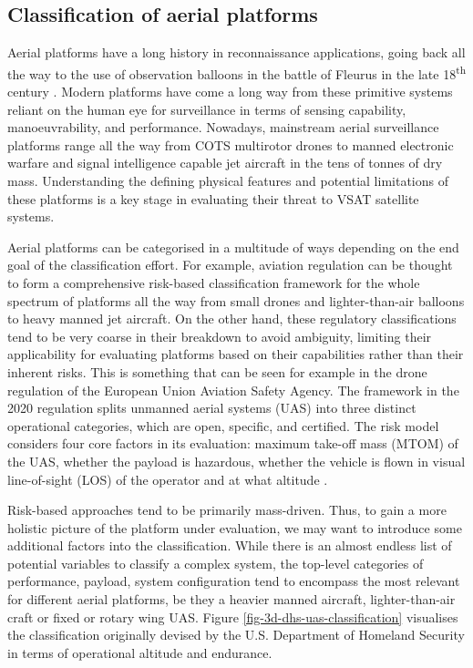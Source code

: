\documentclass[english, 12pt, a4paper, elec, utf8, a-1b, online]{aaltothesis}
\begin{document}
\subsection{Classification of aerial platforms} \label{ch-aerial-platforms}

Aerial platforms have a long history in reconnaissance applications, going back all the way to the use of observation balloons in the battle of Fleurus in the late 18\textsuperscript{th} century \cite{centennial-balloons-fleurus}.
Modern platforms have come a long way from these primitive systems reliant on the human eye for surveillance in terms of sensing capability, manoeuvrability, and performance.
Nowadays, mainstream aerial surveillance platforms range all the way from COTS multirotor drones to manned electronic warfare and signal intelligence capable jet aircraft in the tens of tonnes of dry mass.
Understanding the defining physical features and potential limitations of these platforms is a key stage in evaluating their threat to VSAT satellite systems.

Aerial platforms can be categorised in a multitude of ways depending on the end goal of the classification effort.
For example, aviation regulation can be thought to form a comprehensive risk-based classification framework for the whole spectrum of platforms all the way from small drones and lighter-than-air balloons to heavy manned jet aircraft.
On the other hand, these regulatory classifications tend to be very coarse in their breakdown to avoid ambiguity, limiting their applicability for evaluating platforms based on their capabilities rather than their inherent risks.
This is something that can be seen for example in the drone regulation of the European Union Aviation Safety Agency.
The framework in the 2020 regulation splits unmanned aerial systems (UAS) into three distinct operational categories, which are open, specific, and certified.
The risk model considers four core factors in its evaluation: maximum take-off mass (MTOM) of the UAS, whether the payload is hazardous, whether the vehicle is flown in visual line-of-sight (LOS) of the operator and at what altitude \cite{alamouri2021exploratory}.

Risk-based approaches tend to be primarily mass-driven. Thus, to gain a more holistic picture of the platform under evaluation, we may want to introduce some additional factors into the classification.
While there is an almost endless list of potential variables to classify a complex system, the top-level categories of performance, payload, system configuration tend to encompass the most relevant for different aerial platforms, be they a heavier manned aircraft, lighter-than-air craft or fixed or rotary wing UAS.
Figure \ref{fig-3d-dhs-uas-classification} visualises the classification originally devised by the U.S.
Department of Homeland Security in terms of operational altitude and endurance.
\end{document}

